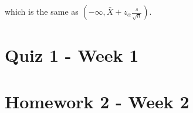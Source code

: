 \documentclass{homework}
\begin{document}
which is the same as $(-\infty,\bar{X} + z_{\alpha}\frac{s}{\sqrt{n}})$. \\

\clearpage

\section{Quiz 1 - Week 1}

\begin{tcolorbox}[title=Question 1]
\end{tcolorbox}

\clearpage

\section{Homework 2 - Week 2}

\begin{tcolorbox}[title=Question 1]
\end{tcolorbox}

\clearpage
\end{document}
